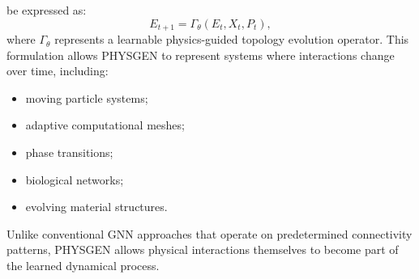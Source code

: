 be expressed as: \begin{equation} E_{t+1} = \Gamma_{\theta}(E_t,X_t,P_t), \end{equation} where $\Gamma_{\theta}$ represents a learnable physics-guided topology evolution operator. This formulation allows PHYSGEN to represent systems where interactions change over time, including: \begin{itemize} \item moving particle systems; \item adaptive computational meshes; \item phase transitions; \item biological networks; \item evolving material structures. \end{itemize} Unlike conventional GNN approaches that operate on predetermined connectivity patterns, PHYSGEN allows physical interactions themselves to become part of the learned dynamical process. %